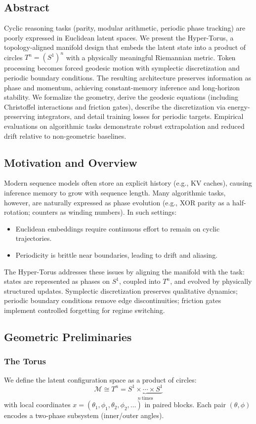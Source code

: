 \documentclass{article}
\numberwithin{equation}{section}
\begin{document}
\subsection*{Abstract}
Cyclic reasoning tasks (parity, modular arithmetic, periodic phase tracking) are poorly expressed in Euclidean latent spaces. We present the Hyper-Torus, a topology-aligned manifold design that embeds the latent state into a product of circles $T^n = (S^1)^n$ with a physically meaningful Riemannian metric. Token processing becomes forced geodesic motion with symplectic discretization and periodic boundary conditions. The resulting architecture preserves information as phase and momentum, achieving constant-memory inference and long-horizon stability. We formalize the geometry, derive the geodesic equations (including Christoffel interactions and friction gates), describe the discretization via energy-preserving integrators, and detail training losses for periodic targets. Empirical evaluations on algorithmic tasks demonstrate robust extrapolation and reduced drift relative to non-geometric baselines.

\subsection{Motivation and Overview}
Modern sequence models often store an explicit history (e.g., KV caches), causing inference memory to grow with sequence length. Many algorithmic tasks, however, are naturally expressed as phase evolution (e.g., XOR parity as a half-rotation; counters as winding numbers). In such settings:
\begin{itemize}
\item Euclidean embeddings require continuous effort to remain on cyclic trajectories.
\item Periodicity is brittle near boundaries, leading to drift and aliasing.
\end{itemize}
The Hyper-Torus addresses these issues by aligning the manifold with the task: states are represented as phases on $S^1$, coupled into $T^n$, and evolved by physically structured updates. Symplectic discretization preserves qualitative dynamics; periodic boundary conditions remove edge discontinuities; friction gates implement controlled forgetting for regime switching.

\subsection{Geometric Preliminaries}
\subsubsection{The Torus}
We define the latent configuration space as a product of circles:
\[
\mathcal{M} \cong T^n = \underbrace{S^1 \times \cdots \times S^1}_{n\ \text{times}}
\]
with local coordinates $x = (\theta_1,\phi_1,\theta_2,\phi_2,\dots)$ in paired blocks. Each pair $(\theta,\phi)$ encodes a two-phase subsystem (inner/outer angles).
\end{document}
